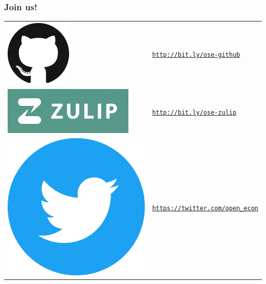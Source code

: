 \begin{frame}\frametitle{Join us!}\vspace{1.25cm}

\vspace{-0.75cm}

\begin{table}[]
	\begin{tabularx}{1\textwidth}{>{\centering\arraybackslash}m{1.5cm} >{\arraybackslash}m{5cm}}
		\href{http://bit.ly/ose-github}{\includegraphics[scale=0.15]{material/crop-github-mark.png}} &
		\href{http://bit.ly/ose-github}{\texttt{http://bit.ly/ose-github}} \\[1cm]
		
		\href{http://bit.ly/ose-zulip}{\includegraphics[scale=0.35]{material/crop-zulip-mark.png}} &
		\href{http://bit.ly/ose-zulip}{\texttt{http://bit.ly/ose-zulip}}    \\[0.8cm]
		
		\href{https://twitter.com/open_econ}{\includegraphics[scale=0.05]{material/crop-twitter-mark.png}} &
		\href{https://twitter.com/open_econ}{\texttt{https://twitter.com/open\_econ}} \\[0.8cm]
		

\end{tabularx}
\end{table}
\end{frame}
